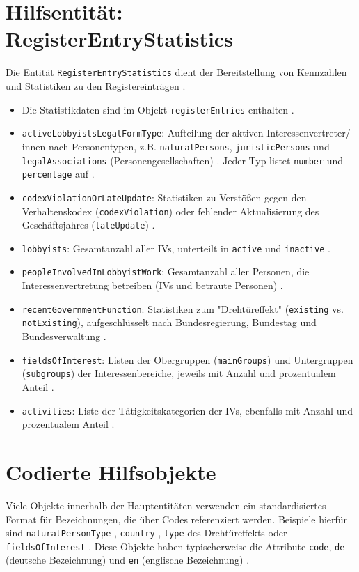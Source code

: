 \documentclass[12pt,twoside=false,a4paper,parskip]{scrbook}
\begin{document}
\section{Hilfsentität: RegisterEntryStatistics}

Die Entität \texttt{RegisterEntryStatistics} dient der Bereitstellung von Kennzahlen und Statistiken zu den Registereinträgen .

\begin{itemize}
\item Die Statistikdaten sind im Objekt \texttt{registerEntries} enthalten .
\item \texttt{activeLobbyistsLegalFormType}: Aufteilung der aktiven Interessenvertreter/-innen nach Personentypen, z.B. \texttt{naturalPersons}, \texttt{juristicPersons} und \texttt{legalAssociations} (Personengesellschaften) . Jeder Typ listet \texttt{number} und \texttt{percentage} auf .
\item \texttt{codexViolationOrLateUpdate}: Statistiken zu Verstößen gegen den Verhaltenskodex (\texttt{codexViolation}) oder fehlender Aktualisierung des Geschäftsjahres (\texttt{lateUpdate}) .
\item \texttt{lobbyists}: Gesamtanzahl aller IVs, unterteilt in \texttt{active} und \texttt{inactive} .
\item \texttt{peopleInvolvedInLobbyistWork}: Gesamtanzahl aller Personen, die Interessenvertretung betreiben (IVs und betraute Personen) .
\item \texttt{recentGovernmentFunction}: Statistiken zum "Drehtüreffekt" (\texttt{existing} vs. \texttt{notExisting}), aufgeschlüsselt nach Bundesregierung, Bundestag und Bundesverwaltung .
\item \texttt{fieldsOfInterest}: Listen der Obergruppen (\texttt{mainGroups}) und Untergruppen (\texttt{subgroups}) der Interessenbereiche, jeweils mit Anzahl und prozentualem Anteil .
\item \texttt{activities}: Liste der Tätigkeitskategorien der IVs, ebenfalls mit Anzahl und prozentualem Anteil .
\end{itemize}

\section{Codierte Hilfsobjekte}
Viele Objekte innerhalb der Hauptentitäten verwenden ein standardisiertes Format für Bezeichnungen, die über Codes referenziert werden. Beispiele hierfür sind \texttt{naturalPersonType} , \texttt{country} , \texttt{type} des Drehtüreffekts  oder \texttt{fieldsOfInterest} . Diese Objekte haben typischerweise die Attribute \texttt{code}, \texttt{de} (deutsche Bezeichnung) und \texttt{en} (englische Bezeichnung) .
\end{document}
